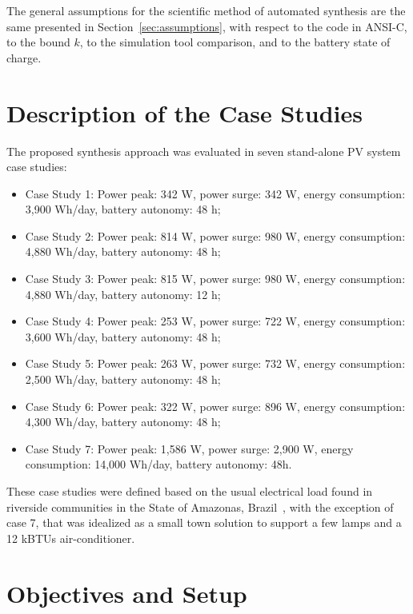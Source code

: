 The general assumptions for the scientific method of automated synthesis are the same presented in Section~\ref{sec:assumptions}, with respect to the code in ANSI-C, to the bound $k$, to the simulation tool comparison, and to the battery state of charge.

\section{Description of the Case Studies} 

The proposed synthesis approach was evaluated in  seven stand-alone PV system case studies: 

\begin{itemize}
\item Case Study 1: Power peak: 342 W, power surge: 342 W, energy consumption: 3,900 Wh/day, battery autonomy: 48 h;
\item Case Study 2: Power peak: 814 W, power surge: 980 W, energy consumption: 4,880 Wh/day, battery autonomy: 48 h;
\item Case Study 3: Power peak: 815 W, power surge: 980 W, energy consumption: 4,880 Wh/day, battery autonomy: 12 h;
\item Case Study 4: Power peak: 253 W, power surge: 722 W, energy consumption: 3,600 Wh/day, battery autonomy: 48 h;
\item Case Study 5: Power peak: 263 W, power surge: 732 W, energy consumption: 2,500 Wh/day, battery autonomy: 48 h;
\item Case Study 6: Power peak: 322 W, power surge: 896 W, energy consumption: 4,300 Wh/day, battery autonomy: 48 h;
\item Case Study 7: Power peak: 1,586 W, power surge: 2,900 W, energy consumption: 14,000 Wh/day, battery autonomy: 48h.
\end{itemize}

These case studies were defined based on the usual electrical load found in riverside communities in the State of Amazonas,  Brazil~\cite{TrindadeCordeiro19, Agrener2013}, with the exception of case 7, that was idealized as a small town solution to support a few lamps and a 12 kBTUs air-conditioner.

\section{Objectives and Setup}
\label{sec:synthesissetup} 

